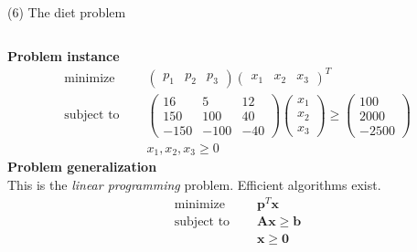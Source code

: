 \documentclass[11pt, aspectratio=149]{beamer}
\theoremstyle{plain}
\begin{document}
\begin{frame}[fragile, t]{(6) The diet problem}
	\begin{columns}
		\begin{column}{0.999\textwidth}
			\textbf{Problem instance}
			\small
			\begin{align*}
			\text{minimize } \quad & 
			\begin{pmatrix}
			p_1 & p_2 & p_3 
			\end{pmatrix}
			 \begin{pmatrix}
			 x_1 & x_2 & x_3 
			 \end{pmatrix}^{T}  \\
			\text{subject to } \quad & \begin{pmatrix}
			16 & 5 & 12 \\ 
			150 & 100 & 40\\ 
			-150 & -100 & -40
			\end{pmatrix}
			\begin{pmatrix}
			x_1  \\ 
			x_2 \\ 
			x_3
			\end{pmatrix}
			\geq 
			\begin{pmatrix}
			100  \\ 
			2000 \\ 
			-2500
			\end{pmatrix} \\
			\quad & x_1, x_2, x_3 \geq 0
			\end{align*}
			\normalsize
			\textbf{Problem generalization}
			\\
			\vspace*{0.5em}
			This is the \emph{linear programming} problem. 
			Efficient algorithms exist.
			\begin{align*}
			\text{minimize } \quad & \mathbf{p}^T \mathbf{x}  \\
			\text{subject to } \quad & \mathbf{A} \mathbf{x} \geq \mathbf{b} \\
			\quad & \mathbf{x} \geq \mathbf{0}
			\end{align*}
			
		\end{column}
	\end{columns}
\end{frame}

\end{document}
